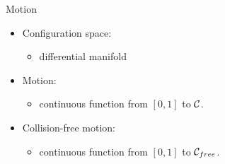 %
%

\begin{frame} {Motion}

\begin{itemize}
\item Configuration space:
  \begin{itemize}
  \item differential manifold
  \end{itemize}
  \pause
\item Motion:
  \begin{itemize}
  \item continuous function from $[0,1]$ to ${\cal C}$.
  \end{itemize}
  \pause
\item Collision-free motion:
  \begin{itemize}
  \item continuous function from $[0,1]$ to ${\cal C}_{free}$.
  \end{itemize}
\end{itemize}
\end{frame}

%
%


